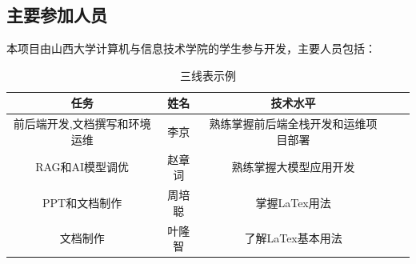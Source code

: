 \documentclass[
    report,     %
    oneside,    %
    UTF8,       %
    zihao=-4    %
]{config} %
\begin{document}
\subsection{主要参加人员}
本项目由山西大学计算机与信息技术学院的学生参与开发，主要人员包括：
\begin{table}[H] %
    \centering %
    \caption{三线表示例} %
    \label{tab:three-line} %
    \renewcommand\arraystretch{0.85} %
    \setlength{\tabcolsep}{12pt} %
    \begin{tabular}{ccccc} %
        \toprule[1.5pt] %
        \textbf{任务} & \textbf{姓名} & \textbf{技术水平} \\ %
        \midrule[0.8pt] %
            前后端开发,文档撰写和环境运维 & 李京 & 熟练掌握前后端全栈开发和运维项目部署 \\ %
            RAG和AI模型调优 & 赵章词 & 熟练掌握大模型应用开发 \\ %
            PPT和文档制作 & 周培聪 & 掌握LaTex用法 \\ %
            文档制作 & 叶隆智 & 了解LaTex基本用法 \\ %
        \hline\hline %
    \end{tabular}
\end{table}
\end{document}
